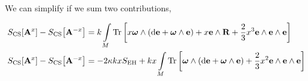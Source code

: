 We can simplify if we sum two contributions,

\begin{align*}
    S_{\textnormal{CS}}\qty[\vb A^x]-S_{\textnormal{CS}}\qty[\vb A^{-x}]&=k\int\limits_M\Tr\qty[x\boldsymbol\omega\wedge\qty(\dd{\vb e}+\boldsymbol\omega\wedge\vb e)+x\vb e\wedge\vb R+\frac23x^3\vb e\wedge\vb e\wedge\vb e]\\
    S_{\textnormal{CS}}\qty[\vb A^x]-S_{\textnormal{CS}}\qty[\vb A^{-x}]&=-2\kappa k x S_{\textnormal{EH}}+kx\int\limits_M\Tr\qty[\boldsymbol\omega\wedge\qty(\dd{\vb e}+\boldsymbol\omega\wedge\vb e)+\frac23x^2\vb e\wedge\vb e\wedge\vb e]
\end{align*}







